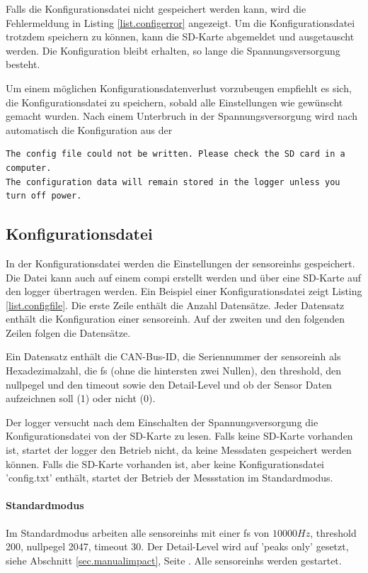 Falls die Konfigurationsdatei nicht gespeichert werden kann, wird die Fehlermeldung in Listing \ref{list.configerror} angezeigt. Um die Konfigurationsdatei trotzdem speichern zu können, kann die SD-Karte abgemeldet und ausgetauscht werden. Die Konfiguration bleibt erhalten, so lange die Spannungsversorgung besteht.

Um einem möglichen Konfigurationsdatenverlust vorzubeugen empfiehlt es sich, die Konfigurationsdatei zu speichern, sobald alle Einstellungen wie gewünscht gemacht wurden. Nach einem Unterbruch in der Spannungsversorgung wird nach automatisch die Konfiguration aus der 

\begin{lstlisting}[caption=Fehlermeldung beim Speichern der Konfigurationsdatei, label=list.configerror]
The config file could not be written. Please check the SD card in a computer.
The configuration data will remain stored in the logger unless you turn off power.
\end{lstlisting}

\subsection{Konfigurationsdatei}
In der Konfigurationsdatei werden die Einstellungen der \glspl{sensoreinh} gespeichert. Die Datei kann auch auf einem \gls{compi} erstellt werden und über eine SD-Karte auf den \gls{logger} übertragen werden. Ein Beispiel einer Konfigurationsdatei zeigt Listing \ref{list.configfile}. Die erste Zeile enthält die Anzahl Datensätze. Jeder Datensatz enthält die Konfiguration einer \gls{sensoreinh}. Auf der zweiten und den folgenden Zeilen folgen die Datensätze. 

Ein Datensatz enthält die CAN-Bus-ID, die Seriennummer der \gls{sensoreinh} als Hexadezimalzahl, die \gls{fs} (ohne die hintersten zwei Nullen), den \gls{threshold}, den \gls{nullpegel} und den \gls{timeout} sowie den Detail-Level und ob der Sensor Daten aufzeichnen soll (1) oder nicht (0).

Der \gls{logger} versucht nach dem Einschalten der Spannungsversorgung die Konfigurationsdatei von der SD-Karte zu lesen. Falls keine SD-Karte vorhanden ist, startet der \gls{logger} den Betrieb nicht, da keine Messdaten gespeichert werden können. Falls die SD-Karte vorhanden ist, aber keine Konfigurationsdatei 'config.txt' enthält, startet der Betrieb der Messstation im Standardmodus.

\paragraph{Standardmodus} Im Standardmodus arbeiten alle \glspl{sensoreinh} mit einer \gls{fs} von \ensuremath{10000 Hz}, \gls{threshold} 200, \gls{nullpegel} 2047, \gls{timeout} 30. Der Detail-Level wird auf 'peaks only' gesetzt, siehe Abschnitt \ref{sec.manualimpact}, Seite \pageref{sec.manualimpact}. Alle \glspl{sensoreinh} werden gestartet.

